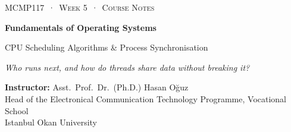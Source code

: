 \documentclass[11pt,a4paper]{article}
\begin{document}
\newcommand{\gantt}[2]{%
\begin{tikzpicture}[x=#1cm,y=1cm]
\foreach \p/\a/\b in {#2} {
  \fill[col\p] (\a,0) rectangle (\b,0.62);
  \draw[white,line width=1.2pt] (\a,0) -- (\a,0.62);
  \node[font=\small\bfseries,text=txt\p] at ({(\a+\b)/2},0.31) {\p};
  \draw[muted] (\a,0) -- (\a,-0.1) node[below,font=\scriptsize,text=muted,inner sep=1.5pt] {\a};
  \draw[muted] (\b,0) -- (\b,-0.1) node[below,font=\scriptsize,text=muted,inner sep=1.5pt] {\b};
}
\end{tikzpicture}}

\thispagestyle{empty}
\begin{tcolorbox}[enhanced,colback=dark,colframe=dark,arc=0pt,boxrule=0pt,
  left=18pt,right=18pt,top=20pt,bottom=20pt,coltext=white]
{\small\color{mint}\textsc{MCMP117 \,·\, Week 5 \,·\, Course Notes}}\par\medskip
{\headfont\fontsize{26}{30}\selectfont\bfseries Fundamentals of Operating Systems}\par\medskip
{\large CPU Scheduling Algorithms \& Process Synchronisation}\par\smallskip
{\small\itshape\color{white!70} Who runs next, and how do threads share data without breaking it?}
\end{tcolorbox}

\vspace{0.4em}
{\small
\textbf{Instructor:} Asst.\ Prof.\ Dr.\ (Ph.D.) Hasan Oğuz\\
Head of the Electronical Communication Technology Programme, Vocational School\\
Istanbul Okan University\par}
\end{document}
